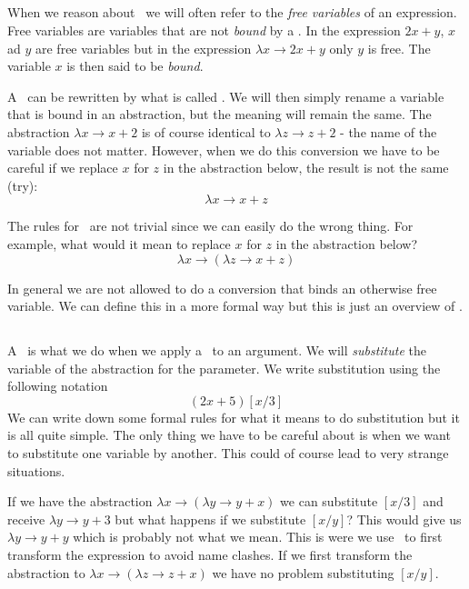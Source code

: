 \documentclass[a4paper,11pt]{article}
\begin{document}
\subsection{\alphac}

When we reason about \lamc\ we will often refer to the {\em free
  variables} of an expression. Free variables are variables that are
not {\em bound} by a \lama. In the expression $2x + y$, $x$ ad $y$ are
free variables but in the expression $\lambda x \rightarrow 2x + y$
only $y$ is free. The variable $x$ is then said to be {\em bound}.

A \lama\ can be rewritten by what is called {\em \alphac}. We will then
simply rename a variable that is bound in an abstraction, but the
meaning will remain the same. The abstraction
$\lambda x \rightarrow x +2$ is of course identical to
$\lambda z \rightarrow z +2$ - the name of the variable does not
matter. However, when we do this conversion we have to be careful if
we replace $x$ for $z$ in the abstraction below, the result is not the
same (try):$$\lambda x \rightarrow x + z$$

The rules for \alphac\ are not trivial since we can easily do the
wrong thing. For example, what would it mean to replace $x$ for $z$ in
the abstraction below? $$\lambda x \rightarrow (\lambda z \rightarrow x + z)$$

In general we are not allowed to do a conversion that binds an
otherwise free variable. We can define this in a more formal way but
this is just an overview of \lamc.

\subsection{\betar}

A \betar\ is what we do when we apply a \lama\ to an argument. We will
{\em substitute} the variable of the abstraction for the parameter. We
write substitution using the following notation $$(2x + 5)[x/3]$$ We
can write down some formal rules for what it means to do substitution
but it is all quite simple. The only thing we have to be careful
about is when we want to substitute one variable by another. This
could of course lead to very strange situations. 

If we have the abstraction
$\lambda x \rightarrow (\lambda y \rightarrow y + x)$ we can
substitute $[x/3]$ and receive $\lambda y \rightarrow y + 3$ but what
happens if we substitute $[x/y]$? This would give us
$\lambda y \rightarrow y + y$ which is probably not what we mean. This
is were we use \alphac\ to first transform the expression to avoid
name clashes. If we first transform the abstraction to
$\lambda x \rightarrow (\lambda z \rightarrow z + x)$ we have no
problem substituting $[x/y]$.
\end{document}
